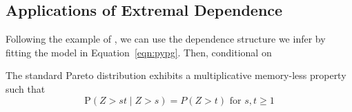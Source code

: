 \begin{comment}
                \item need to make a statement harkening back to the fact this is a simulation of
                    storm parameters sampled via latin hypercube, so the definition of 'return period'
                    in this context is suspect.
            \end{itemize}
            \item Given shaky conception of multivariate return period, we might consider alternative 
                definitions more relevant to an inundation field.
            \begin{itemize}
                \item Total Inundation field?  (some univariate transformation?)
                \item number of locales under significant flooding?
            \end{itemize}
        \end{itemize}
        \item Application results
    \end{itemize}
\end{comment}

\subsection{Applications of Extremal Dependence}
Following the example of \cite{trubey:pg}, we can use the dependence structure we infer
    by fitting the model in Equation~\eqref{eqn:pypg}.  Then, conditional on



The standard Pareto distribution exhibits a multiplicative memory-less property such that
\[
\text{P}(Z > st \mid Z > s) = P(Z > t)\text{ for }s,t \geq 1
\]

